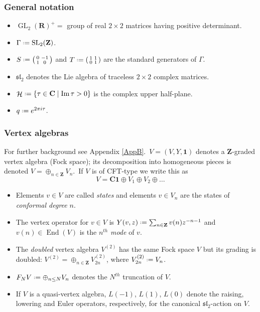 \documentclass[12pt]{amsart}
\theoremstyle{plain}
\theoremstyle{definition}
\theoremstyle{remark}
\DeclareMathOperator{\uhp}{\mathcal{H}}
\DeclareMathOperator{\Endo}{End}
\DeclareMathOperator{\GL}{GL}
\DeclareMathOperator{\SL}{SL}
\newcommand*{\df}{\mathrel{\vcenter{\baselineskip0.5ex \lineskiplimit0pt
                     \hbox{\scriptsize.}\hbox{\scriptsize.}}} =}
\providecommand{\stwomat}[4]{\left(\begin{smallmatrix}#1&#2\\#3&#4\end{smallmatrix}\right)}
\newcommand{\CC}{\mathbf{C}}
\newcommand{\ZZ}{\mathbf{Z}}
\newcommand{\RR}{\mathbf{R}}
\renewcommand{\Im}{\operatorname{Im}}
\newcommand{\bone}{\mathbf{1}}
\begin{document}
\subsubsection{General notation}
\begin{itemize}
    \item[---] $\GL_2(\RR)^+=$ group of real $2\times 2$ matrices having positive determinant.
    \item[---] $\Gamma\df\SL_2(\ZZ)$.
    \item[---] $S\df\stwomat{0}{-1}{1}{0}$ and $T\df \stwomat 1101$ are the standard generators of $\Gamma$.
    \item[---] $\mathfrak{sl}_2$ denotes the Lie algebra of traceless $2\times 2$ complex matrices.
    \item[---] $\uhp \df \{\tau\in\CC\mid \Im\tau>0\}$ is the complex upper half-plane.
    \item[---] $q\df e^{2\pi i\tau}$.
\end{itemize}

\subsubsection{Vertex algebras}
For further background see Appendix \ref{AppB}.\ $V=(V, Y, \mathbf{1})$ denotes a $\ZZ$-graded vertex algebra (Fock space); its decomposition into homogeneous pieces is denoted $V=\oplus _{n\in\ZZ} V_n$.\  If $V$ is of CFT-type we write this as
\[
V=\CC\bone \oplus V_1\oplus V_2\oplus \hdots
\]
\begin{itemize}
    \item[---]Elements $v\in V$ are called \emph{states} and elements $v\in V_n$ are the states of  \emph{conformal degree} $n$.
    \item[---] The vertex operator for $v \in V$ is $Y(v, z)\df \sum_{n\in\ZZ} v(n)z^{-n-1}$ and $v(n)\in \Endo(V)$ is the $n^{th}$ \emph{mode} of $v$.
    \item[---] The \emph{doubled} vertex algebra $V^{(2)}$ has the same Fock space $V$ but its grading is doubled: $V^{(2)}=\oplus_{n\in\ZZ} V^{(2)}_{2n}$, where $V^{(2)}_{2n}\df V_n$.
    \item[---] $F_NV\df \oplus_{n\leq N} V_n$ denotes the $N^{th}$ truncation of $V$.
    \item[---] If $V$ is a quasi-vertex algebra, $L(-1)$, $L(1)$, $L(0)$ denote the raising, lowering and Euler operators, respectively, for the canonical $\mathfrak{sl}_2$-action on $V$.
\end{itemize} 
\end{document}
